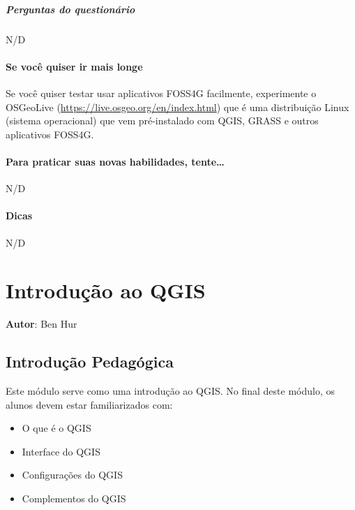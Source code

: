 \documentclass[
]{book}
\providecommand{\tightlist}{%
  \setlength{\itemsep}{0pt}\setlength{\parskip}{0pt}}
\begin{document}
\hypertarget{perguntas-do-questionuxe1rio-1}{%
\paragraph{Perguntas do questionário}\label{perguntas-do-questionuxe1rio-1}}

N/D

\hypertarget{se-vocuxea-quiser-ir-mais-longe}{%
\subsubsection{Se você quiser ir mais longe}\label{se-vocuxea-quiser-ir-mais-longe}}

Se você quiser testar usar aplicativos FOSS4G facilmente, experimente o OSGeoLive (\url{https://live.osgeo.org/en/index.html}) que é uma distribuição Linux (sistema operacional) que vem pré-instalado com QGIS, GRASS e outros aplicativos FOSS4G.

\hypertarget{para-praticar-suas-novas-habilidades-tente}{%
\subsubsection{Para praticar suas novas habilidades, tente\ldots{}}\label{para-praticar-suas-novas-habilidades-tente}}

N/D

\hypertarget{dicas}{%
\subsubsection{Dicas}\label{dicas}}

N/D

\hypertarget{introduuxe7uxe3o-ao-qgis}{%
\chapter{Introdução ao QGIS}\label{introduuxe7uxe3o-ao-qgis}}

\textbf{Autor}: Ben Hur

\hypertarget{introduuxe7uxe3o-pedaguxf3gica-1}{%
\section{Introdução Pedagógica}\label{introduuxe7uxe3o-pedaguxf3gica-1}}

Este módulo serve como uma introdução ao QGIS. No final deste módulo, os alunos devem estar familiarizados com:

\begin{itemize}
\tightlist
\item
  O que é o QGIS
\item
  Interface do QGIS
\item
  Configurações do QGIS
\item
  Complementos do QGIS
\end{itemize}
\end{document}
